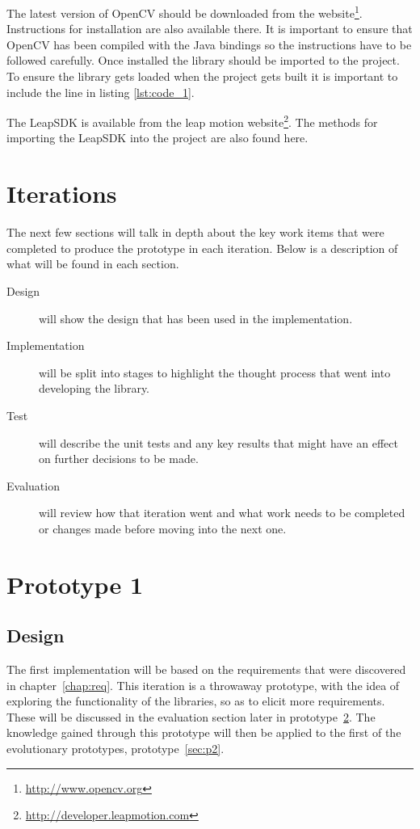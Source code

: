 \documentclass[11pt,oneside]{report}
\begin{document}
		The latest version of OpenCV should be downloaded from the website\footnote{\url{http://www.opencv.org}}.
		Instructions for installation are also available there.
		It is important to ensure that OpenCV has been compiled with the Java bindings so the instructions have to be followed carefully.
		Once installed the library should be imported to the project. %
		To ensure the library gets loaded when the project gets built it is important to include the line in listing \ref{lst:code_1}.
		
				
		The LeapSDK is available from the leap motion website\footnote{\url{http://developer.leapmotion.com}}.
		The methods for importing the LeapSDK into the project are also found here.
	\section{Iterations}
		The next few sections will talk in depth about the key work items that were completed to produce the prototype in each iteration.
		Below is a description of what will be found in each section.
		\begin{description}
		\item[Design] will show the design that has been used in the implementation.
		\item[Implementation] will be split into stages to highlight the thought process that went into developing the library.
		\item[Test] will describe the unit tests and any key results that might have an effect on further decisions to be made.
		\item[Evaluation] will review how that iteration went and what work needs to be completed or changes made before moving into the next one.
		\end{description}
	\section{Prototype 1}\label{sec:p1}
		\subsection{Design}
		The first implementation will be based on the requirements that were discovered in chapter~\ref{chap:req}.
		This iteration is a throwaway prototype, with the idea of exploring the functionality of the libraries, so as to elicit more requirements.
		These will be discussed in the evaluation section later in prototype~\ref{sec:p1}.
		The knowledge gained through this prototype will then be applied to the first of the evolutionary prototypes, prototype~\ref{sec:p2}.
\end{document}
